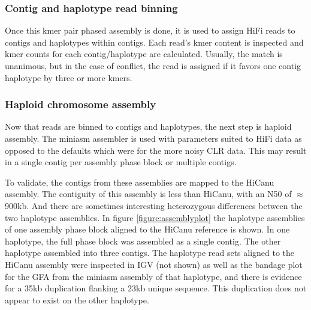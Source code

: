 {\subsubsection{Contig and haplotype read binning}

\par{
Once this kmer pair phased assembly is done, it is used to assign HiFi reads to contigs and haplotypes within contigs. Each read's kmer content is inspected and kmer counts for each contig/haplotype are calculated. Usually, the match is unanimous, but in the case of conflict, the read is assigned if it favors one contig haplotype by three or more kmers. 
}

\subsubsection{Haploid chromosome assembly}

\par{
Now that reads are binned to contigs and haplotypes, the next step is haploid assembly. The miniasm assembler is used with parameters suited to HiFi data as opposed to the defaults which were for the more noisy CLR data\cite{miniasm}. This may result in a single contig per assembly phase block or multiple contigs. }

\par{ To validate, the contigs from these assemblies are mapped to the HiCanu assembly. The contiguity of this assembly is less than HiCanu, with an N50 of $\approx$900kb. And there are sometimes interesting heterozygous differences between the two haplotype assemblies. In figure \ref{figure:assemblyplot} the haplotype assemblies of one assembly phase block aligned to the HiCanu reference is shown. In one haplotype, the full phase block was assembled as a single contig. The other haplotype assembled into three contigs. The haplotype read sets aligned to the HiCanu assembly were inspected in IGV (not shown) as well as the bandage plot for the GFA from the miniasm assembly of that haplotype, and there is evidence for a 35kb duplication flanking a 23kb unique sequence\cite{bandage}. This duplication does not appear to exist on the other haplotype.
}

}
